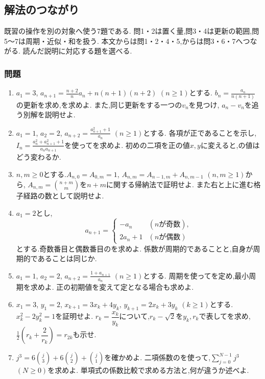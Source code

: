 \subsection{解法のつながり}\label{節：接続演習}
  既習の操作を別の対象へ使う7題である.
                問1・2は置く量,問3・4は更新の範囲,問5〜7は周期・近似・和を扱う.
                本文からは問1・2・4・5,からは問3・6・7へつながる.
                読んだ説明に対応する題を選べる.

  \subsubsection{問題}
  \begin{enumerate}[label=\textbf{問\arabic*.},format=\bookitemlink{practice-connections}{problem}{answer}]
    \item $a_1=3$,
      $a_{n+1}=\frac{n+2}{n}a_n+n(n+1)(n+2)$ $(n\ge1)$とする.
      $b_n=\frac{a_n}{n(n+1)}$の更新を求め,を求めよ.
      また,同じ更新をする一つの$v_n$を見つけ,
      $a_n-v_n$を追う別解を説明せよ.
    \item $a_1=1$, $a_2=2$,
      $a_{n+2}=\frac{a_{n+1}^2+1}{a_n}$ $(n\ge1)$とする.
      各項が正であることを示し,
      $I_n=\frac{a_n^2+a_{n+1}^2+1}{a_na_{n+1}}$を使ってを求めよ.
      初めの二項を正の値$x,y$に変えると,の値はどう変わるか.
    \item $n,m\ge0$とする.$A_{n,0}=A_{0,m}=1$,
      $A_{n,m}=A_{n-1,m}+A_{n,m-1}$ $(n,m\ge1)$から,
      $A_{n,m}=\binom{n+m}{m}$を$n+m$に関する帰納法で証明せよ.
      また右と上に進む格子経路の数として説明せよ.
    \item $a_1=2$とし,
      \[
        a_{n+1}=\begin{cases}
          -a_n&(n\text{が奇数}),\\
          2a_n+1&(n\text{が偶数})
        \end{cases}
      \]
      とする.奇数番目と偶数番目のを求めよ.
      係数が周期的であることと,自身が周期的であることは同じか.
    \item $a_1=1$, $a_2=2$,
      $a_{n+2}=\frac{1+a_{n+1}}{a_n}$ $(n\ge1)$とする.
      周期を使ってを定め,最小周期を求めよ.
      正の初期値を変えて定となる場合も求めよ.
    \item $x_1=3$, $y_1=2$,
      $x_{k+1}=3x_k+4y_k$, $y_{k+1}=2x_k+3y_k$ $(k\ge1)$とする.
      $x_k^2-2y_k^2=1$を証明せよ.
      $r_k=\dfrac{x_k}{y_k}$について,$r_k-\sqrt2$を$y_k,r_k$で表してを求め,
      $\frac12\left(r_k+\dfrac{2}{r_k}\right)=r_{2k}$も示せ.
    \item $j^3=6\binom j3+6\binom j2+\binom j1$を確かめよ.
      二項係数のを使って,$\sum_{j=0}^{N-1}j^3$ $(N\ge0)$を求めよ.
      単項式の係数比較で求める方法と,何が違うか述べよ.
  \end{enumerate}

